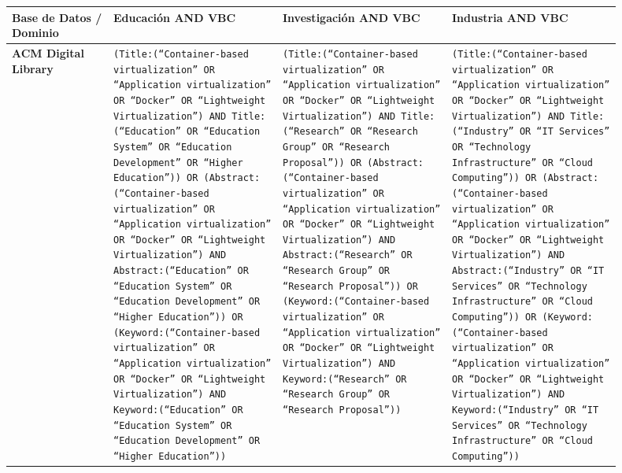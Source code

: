 \begin{table}[htbp]
\centering
\scriptsize
\renewcommand{\arraystretch}{1.5}
\begin{adjustbox}{max width=\textwidth}
\begin{tabular}{|P{0.15\linewidth}|P{0.25\linewidth}|P{0.25\linewidth}|P{0.25\linewidth}|}
\hline
\textbf{Base de Datos / Dominio} & \textbf{Educación AND VBC} & \textbf{Investigación AND VBC} & \textbf{Industria AND VBC} \\
\hline

\textbf{ACM Digital Library} 
& \tiny \texttt{(Title:(``Container-based virtualization'' OR ``Application virtualization'' OR ``Docker'' OR ``Lightweight Virtualization'') AND Title:(``Education'' OR ``Education System'' OR ``Education Development'' OR ``Higher Education'')) OR (Abstract:(``Container-based virtualization'' OR ``Application virtualization'' OR ``Docker'' OR ``Lightweight Virtualization'') AND Abstract:(``Education'' OR ``Education System'' OR ``Education Development'' OR ``Higher Education'')) OR (Keyword:(``Container-based virtualization'' OR ``Application virtualization'' OR ``Docker'' OR ``Lightweight Virtualization'') AND Keyword:(``Education'' OR ``Education System'' OR ``Education Development'' OR ``Higher Education''))} 
& \tiny \texttt{(Title:(``Container-based virtualization'' OR ``Application virtualization'' OR ``Docker'' OR ``Lightweight Virtualization'') AND Title:(``Research'' OR ``Research Group'' OR ``Research Proposal'')) OR (Abstract:(``Container-based virtualization'' OR ``Application virtualization'' OR ``Docker'' OR ``Lightweight Virtualization'') AND Abstract:(``Research'' OR ``Research Group'' OR ``Research Proposal'')) OR (Keyword:(``Container-based virtualization'' OR ``Application virtualization'' OR ``Docker'' OR ``Lightweight Virtualization'') AND Keyword:(``Research'' OR ``Research Group'' OR ``Research Proposal''))} 
& \tiny \texttt{(Title:(``Container-based virtualization'' OR ``Application virtualization'' OR ``Docker'' OR ``Lightweight Virtualization'') AND Title:(``Industry'' OR ``IT Services'' OR ``Technology Infrastructure'' OR ``Cloud Computing'')) OR (Abstract:(``Container-based virtualization'' OR ``Application virtualization'' OR ``Docker'' OR ``Lightweight Virtualization'') AND Abstract:(``Industry'' OR ``IT Services'' OR ``Technology Infrastructure'' OR ``Cloud Computing'')) OR (Keyword:(``Container-based virtualization'' OR ``Application virtualization'' OR ``Docker'' OR ``Lightweight Virtualization'') AND Keyword:(``Industry'' OR ``IT Services'' OR ``Technology Infrastructure'' OR ``Cloud Computing''))} \\
\hline


\end{tabular}
\end{adjustbox}
\end{table}
